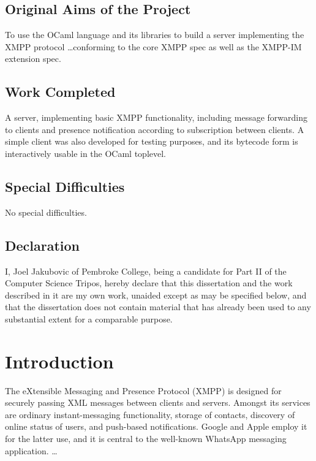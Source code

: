 \documentclass[12pt,a4paper,twoside,openright]{report}
\begin{document}
{\section*{Original Aims of the Project}

To use the OCaml language and its libraries to build a server implementing the XMPP protocol \ldots conforming to the core XMPP spec as well as the XMPP-IM extension spec.

\section*{Work Completed}

A server, implementing basic XMPP functionality, including message forwarding to clients and presence notification according to subscription between clients. A simple client was also developed for testing purposes, and its bytecode form is interactively usable in the OCaml toplevel.

\section*{Special Difficulties}

No special difficulties.

\newpage
\section*{Declaration}

I, Joel Jakubovic of Pembroke College, being a candidate for Part II of the Computer
Science Tripos, hereby declare
that this dissertation and the work described in it are my own work,
unaided except as may be specified below, and that the dissertation
does not contain material that has already been used to any substantial
extent for a comparable purpose.

\bigskip
{}

\medskip
{}

\tableofcontents


\pagestyle{headings}

\chapter{Introduction}
The eXtensible Messaging and Presence Protocol (XMPP) is designed for securely passing XML messages between clients and servers. Amongst its services are ordinary instant-messaging functionality, storage of contacts, discovery of online status of users, and push-based notifications. Google and Apple employ it for the latter use, and it is central to the well-known WhatsApp messaging application. \ldots

}
\end{document}
